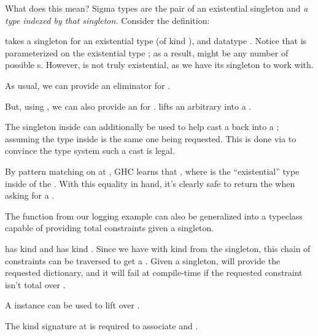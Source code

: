 \documentclass[book.tex]{subfiles}
\begin{document}
What does this mean? Sigma types are the pair of an existential singleton and
\emph{a type indexed by that singleton.} Consider the definition:


 takes a singleton for an existential type  (of kind ),
and datatype . Notice that  is parameterized on the existential
type ; as a result,  might be any number of possible s. However,  is not truly existential, as we have its singleton to work
with.

As usual, we can provide an eliminator for .


But, using , we can also provide an  for
.  lifts an arbitrary  into a .


The singleton inside  can additionally be used to help cast a
 back into a ; assuming the type inside is the same one
being requested. This is done via  to convince the type system such
a cast is legal.


By pattern matching on  at , GHC learns that ,
where  is the ``existential'' type inside of the . With this
equality in hand, it's clearly safe to return the  when asking for a
.

The  function from our logging example can also be generalized into a
typeclass capable of providing total constraints given a singleton.


 has kind  and  has kind .
Since we have  with kind  from the singleton, this chain of
constraints can be traversed to get a . Given a singleton,
 will provide the requested dictionary, and it will fail at
compile-time if the requested constraint isn't total over .

A  instance can be used to lift  over .


The \gls{kind signature} at  is required to associate  and .
\end{document}
